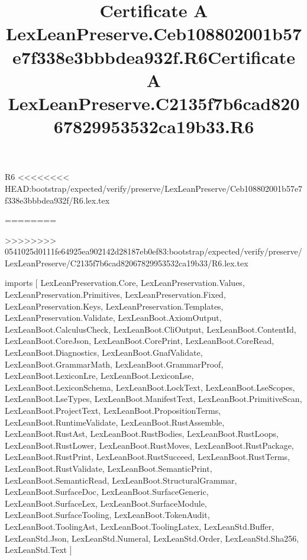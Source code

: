 \begin{lexlean}{R6}
<<<<<<<< HEAD:bootstrap/expected/verify/preserve/LexLeanPreserve/Ceb108802001b57e7f338e3bbbdea932f/R6.lex.tex
\title{Certificate A LexLeanPreserve.Ceb108802001b57e7f338e3bbbdea932f.R6}
========
\title{Certificate A LexLeanPreserve.C2135f7b6cad82067829953532ca19b33.R6}
>>>>>>>> 0541025d0111fe64925ea902142d28187eb0ef83:bootstrap/expected/verify/preserve/LexLeanPreserve/C2135f7b6cad82067829953532ca19b33/R6.lex.tex
\begin{coremodule}
imports [
  LexLeanPreservation.Core,
  LexLeanPreservation.Values,
  LexLeanPreservation.Primitives,
  LexLeanPreservation.Fixed,
  LexLeanPreservation.Keys,
  LexLeanPreservation.Templates,
  LexLeanPreservation.Validate,
  LexLeanBoot.AxiomOutput,
  LexLeanBoot.CalculusCheck,
  LexLeanBoot.CliOutput,
  LexLeanBoot.ContentId,
  LexLeanBoot.CoreJson,
  LexLeanBoot.CorePrint,
  LexLeanBoot.CoreRead,
  LexLeanBoot.Diagnostics,
  LexLeanBoot.GnafValidate,
  LexLeanBoot.GrammarMath,
  LexLeanBoot.GrammarProof,
  LexLeanBoot.LexiconLre,
  LexLeanBoot.LexiconLse,
  LexLeanBoot.LexiconSchema,
  LexLeanBoot.LockText,
  LexLeanBoot.LseScopes,
  LexLeanBoot.LseTypes,
  LexLeanBoot.ManifestText,
  LexLeanBoot.PrimitiveScan,
  LexLeanBoot.ProjectText,
  LexLeanBoot.PropositionTerms,
  LexLeanBoot.RuntimeValidate,
  LexLeanBoot.RustAssemble,
  LexLeanBoot.RustAst,
  LexLeanBoot.RustBodies,
  LexLeanBoot.RustLoops,
  LexLeanBoot.RustLower,
  LexLeanBoot.RustMoves,
  LexLeanBoot.RustPackage,
  LexLeanBoot.RustPrint,
  LexLeanBoot.RustSucceed,
  LexLeanBoot.RustTerms,
  LexLeanBoot.RustValidate,
  LexLeanBoot.SemanticPrint,
  LexLeanBoot.SemanticRead,
  LexLeanBoot.StructuralGrammar,
  LexLeanBoot.SurfaceDoc,
  LexLeanBoot.SurfaceGeneric,
  LexLeanBoot.SurfaceLex,
  LexLeanBoot.SurfaceModule,
  LexLeanBoot.SurfaceTooling,
  LexLeanBoot.TokenAudit,
  LexLeanBoot.ToolingAst,
  LexLeanBoot.ToolingLatex,
  LexLeanStd.Buffer,
  LexLeanStd.Json,
  LexLeanStd.Numeral,
  LexLeanStd.Order,
  LexLeanStd.Sha256,
  LexLeanStd.Text
]


\end{coremodule}
\end{lexlean}
